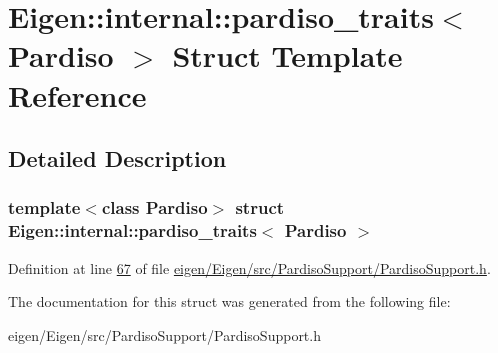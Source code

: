 \hypertarget{struct_eigen_1_1internal_1_1pardiso__traits}{}\section{Eigen\+:\+:internal\+:\+:pardiso\+\_\+traits$<$ Pardiso $>$ Struct Template Reference}
\label{struct_eigen_1_1internal_1_1pardiso__traits}


\subsection{Detailed Description}
\subsubsection*{template$<$class Pardiso$>$\newline
struct Eigen\+::internal\+::pardiso\+\_\+traits$<$ Pardiso $>$}



Definition at line \hyperlink{eigen_2_eigen_2src_2_pardiso_support_2_pardiso_support_8h_source_l00067}{67} of file \hyperlink{eigen_2_eigen_2src_2_pardiso_support_2_pardiso_support_8h_source}{eigen/\+Eigen/src/\+Pardiso\+Support/\+Pardiso\+Support.\+h}.



The documentation for this struct was generated from the following file\+:\begin{DoxyCompactItemize}
\item 
eigen/\+Eigen/src/\+Pardiso\+Support/\+Pardiso\+Support.\+h\end{DoxyCompactItemize}

